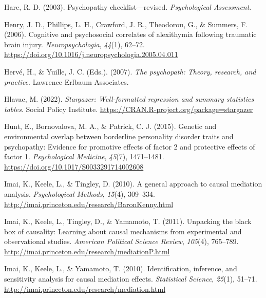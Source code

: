 \documentclass[
  man,floatsintext]{apa7}
\newlength{\cslhangindent}
\newlength{\cslentryspacingunit} %
\newenvironment{CSLReferences}[2] %
 {%
  \setlength{\parindent}{0pt}
  \ifodd #1
  \let\oldpar\par
  \def\par{\hangindent=\cslhangindent\oldpar}
  \fi
  \setlength{\parskip}{#2\cslentryspacingunit}
 }%
 {}
\begin{document}
\begin{CSLReferences}{1}{0}
\leavevmode{}%
Hare, R. D. (2003). Psychopathy checklist---revised. \emph{Psychological Assessment}.

\leavevmode{}%
Henry, J. D., Phillips, L. H., Crawford, J. R., Theodorou, G., \& Summers, F. (2006). Cognitive and psychosocial correlates of alexithymia following traumatic brain injury. \emph{Neuropsychologia}, \emph{44}(1), 62--72. \url{https://doi.org/10.1016/j.neuropsychologia.2005.04.011}

\leavevmode{}%
Hervé, H., \& Yuille, J. C. (Eds.). (2007). \emph{The psychopath: Theory, research, and practice}. {Lawrence Erlbaum Associates}.

\leavevmode{}%
Hlavac, M. (2022). \emph{Stargazer: Well-formatted regression and summary statistics tables}. Social Policy Institute. \url{https://CRAN.R-project.org/package=stargazer}

\leavevmode{}%
Hunt, E., Bornovalova, M. A., \& Patrick, C. J. (2015). Genetic and environmental overlap between borderline personality disorder traits and psychopathy: Evidence for promotive effects of factor 2 and protective effects of factor 1. \emph{Psychological Medicine}, \emph{45}(7), 1471--1481. \url{https://doi.org/10.1017/S0033291714002608}

\leavevmode{}%
Imai, K., Keele, L., \& Tingley, D. (2010). A general approach to causal mediation analysis. \emph{Psychological Methods}, \emph{15}(4), 309--334. \url{http://imai.princeton.edu/research/BaronKenny.html}

\leavevmode{}%
Imai, K., Keele, L., Tingley, D., \& Yamamoto, T. (2011). Unpacking the black box of causality: Learning about causal mechanisms from experimental and observational studies. \emph{American Political Science Review}, \emph{105}(4), 765--789. \url{http://imai.princeton.edu/research/mediationP.html}

\leavevmode{}%
Imai, K., Keele, L., \& Yamamoto, T. (2010). Identification, inference, and sensitivity analysis for causal mediation effects. \emph{Statistical Science}, \emph{25}(1), 51--71. \url{http://imai.princeton.edu/research/mediation.html}


\end{CSLReferences}
\end{document}
